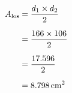 \documentclass[preview]{standalone}
\begin{document}
\begin{align*}
\special{dvisvgm:raw <g id='unique000'>}A_{\text{los}} &= \frac{d_1 \times d_2}{2} \\[6pt] \special{dvisvgm:raw </g>}\special{dvisvgm:raw <g id='unique001'>}&= \frac{166 \times 106}{2} \\[6pt] \special{dvisvgm:raw </g>}\special{dvisvgm:raw <g id='unique002'>}&= \frac{17{.}596}{2} \\[6pt] \special{dvisvgm:raw </g>}\special{dvisvgm:raw <g id='unique003'>}&= 8{.}798\,\text{cm}^2\special{dvisvgm:raw </g>}
\end{align*}
\end{document}
